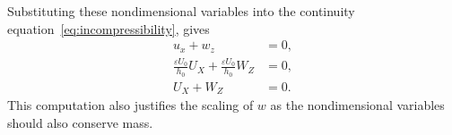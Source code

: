 
  Substituting these nondimensional variables into the continuity
  equation~\eqref{eq:incompressibility}, gives
  \begin{align*}
    u_x + w_z &= 0, \\
    \frac{\varepsilon U_0}{h_0} U_X + \frac{\varepsilon U_0}{h_0} W_Z &= 0, \\
    U_X + W_Z &= 0.
  \end{align*}
  This computation also justifies the scaling of \(w\) as the nondimensional variables
  should also conserve mass.

